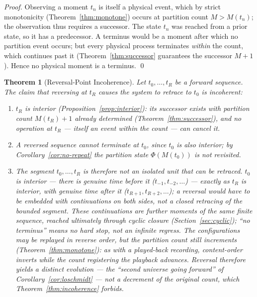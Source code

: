 \documentclass[twocolumn,10pt,a4paper]{article}
\theoremstyle{thmstyle}
\newtheorem{theorem}{Theorem}[section]
\theoremstyle{definition}
\theoremstyle{remark}
\newcommand{\PhiMap}{\varPhi}
\begin{document}
\begin{proof}
Observing a moment $t_n$ is itself a physical event, which by strict
monotonicity (Theorem~\ref{thm:monotone}) occurs at partition count
$M > M(t_n)$; the observation thus requires a successor. The state $t_n$ was
reached from a prior state, so it has a predecessor. A terminus would be a
moment after which no partition event occurs; but every physical process
terminates \emph{within} the count, which continues past it
(Theorem~\ref{thm:successor} guarantees the successor $M+1$). Hence no physical
moment is a terminus. \qed
\end{proof}

\begin{theorem}[Reversal-Point Incoherence]
\label{thm:reversal-point}
Let $t_0,\ldots,t_R$ be a forward sequence. The claim that reversing at $t_R$
causes the system to retrace to $t_0$ is incoherent:
\begin{enumerate}[leftmargin=1.5em,label=(\roman*),itemsep=0.1em]
\item $t_R$ is interior (Proposition~\ref{prop:interior}): its successor exists
  with partition count $M(t_R)+1$ already determined
  (Theorem~\ref{thm:successor}), and no operation \emph{at} $t_R$ --- itself an
  event within the count --- can cancel it.
\item A reversed sequence cannot terminate at $t_0$, since $t_0$ is also
  interior; by Corollary~\ref{cor:no-repeat} the partition state
  $\PhiMap(M(t_0))$ is not revisited.
\item The segment $t_0,\ldots,t_R$ is therefore not an isolated unit that can be
  retraced. $t_0$ is interior --- there is genuine time before it
  ($t_{-1}, t_{-2}, \ldots$) --- exactly as $t_R$ is interior, with genuine time
  after it ($t_{R+1}, t_{R+2}, \ldots$); a reversal would have to be embedded
  with continuations on \emph{both} sides, not a closed retracing of the bounded
  segment. These continuations are further moments of the same finite sequence,
  reached ultimately through cyclic closure (Section~\ref{sec:cyclic}); ``no
  terminus'' means no hard stop, not an infinite regress. The configurations may
  be replayed in reverse order, but the partition count still increments
  (Theorem~\ref{thm:monotone}): as with a played-back recording, content-order
  inverts while the count registering the playback advances. Reversal therefore
  yields a distinct evolution --- the ``second universe going forward'' of
  Corollary~\ref{cor:loschmidt} --- not a decrement of the original count, which
  Theorem~\ref{thm:incoherence} forbids.
\end{enumerate}
\end{theorem}
\end{document}
